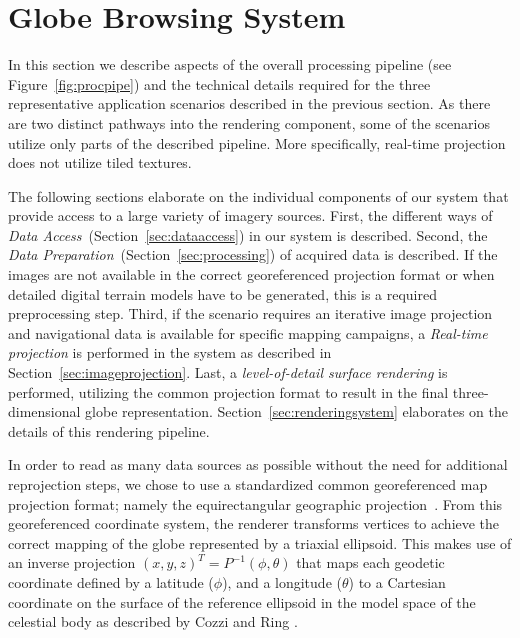 \documentclass[journal]{vgtc}                %
\newcommand{\fig}[1]{Figure~\ref{fig:#1}}
\begin{document}

\section{Globe Browsing System} \label{sec:overview}
In this section we describe aspects of the overall processing pipeline (see \fig{procpipe}) and the technical details required for the three representative application scenarios described in the previous section.
As there are two distinct pathways into the rendering component, some of the scenarios utilize only parts of the described pipeline. More specifically, real-time projection does not utilize tiled textures.

The following sections elaborate on the individual components of our system that provide access to a large variety of imagery sources.
First, the different ways of \emph{Data Access}~(Section~\ref{sec:dataaccess}) in our system is described.
Second, the \emph{Data Preparation}~(Section~\ref{sec:processing}) of acquired data is described. If the images are not available in the correct georeferenced projection format or when detailed digital terrain models have to be generated, this is a required preprocessing step.
Third, if the scenario requires an iterative image projection and navigational data is available for specific mapping campaigns, a \emph{Real-time projection} is performed in the system as described in Section~\ref{sec:imageprojection}.
Last, a \emph{level-of-detail surface rendering} is performed, utilizing the common projection format to result in the final three-dimensional globe representation.
Section~\ref{sec:renderingsystem} elaborates on the details of this rendering pipeline.

In order to read as many data sources as possible without the need for additional reprojection steps, we chose to use a standardized common georeferenced map projection format; namely the equirectangular geographic projection~\cite{snyder1997flattening}.
From this georeferenced coordinate system, the renderer transforms vertices to achieve the correct mapping of the globe represented by a triaxial ellipsoid.
This makes use of an inverse projection $(x,y,z)^T = P^{-1}(\phi, \theta)$ that maps each geodetic coordinate defined by a latitude ($\phi$), and a longitude ($\theta$) to a Cartesian coordinate on the surface of the reference ellipsoid in the model space of the celestial body as described by Cozzi and Ring \cite{cozzi20113d}.
\end{document}
